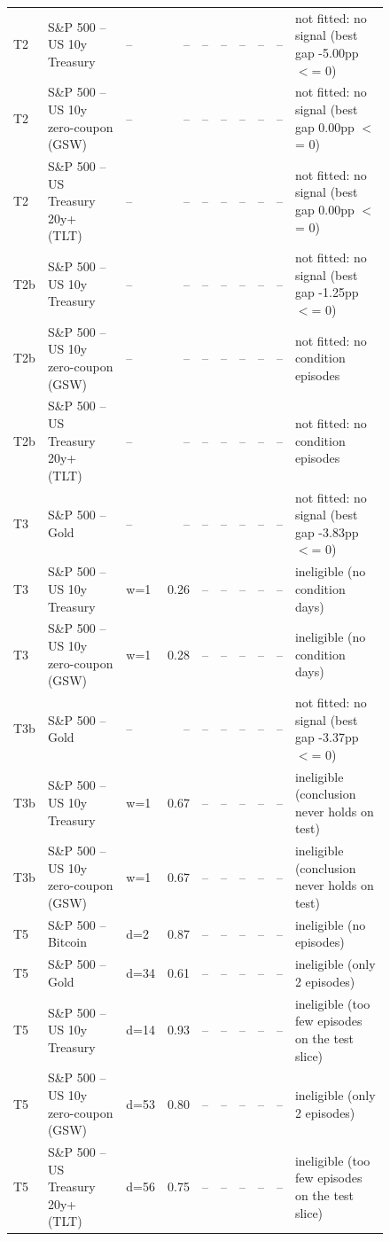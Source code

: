 \begin{figure}
\begin{tabular}{lllrrrrrrl}
T2 & S\&P 500 -- US 10y Treasury & -- & -- & -- & -- & -- & -- & -- & not fitted: no signal (best gap -5.00pp $<$= 0) \\
T2 & S\&P 500 -- US 10y zero-coupon (GSW) & -- & -- & -- & -- & -- & -- & -- & not fitted: no signal (best gap 0.00pp $<$= 0) \\
T2 & S\&P 500 -- US Treasury 20y+ (TLT) & -- & -- & -- & -- & -- & -- & -- & not fitted: no signal (best gap 0.00pp $<$= 0) \\
T2b & S\&P 500 -- US 10y Treasury & -- & -- & -- & -- & -- & -- & -- & not fitted: no signal (best gap -1.25pp $<$= 0) \\
T2b & S\&P 500 -- US 10y zero-coupon (GSW) & -- & -- & -- & -- & -- & -- & -- & not fitted: no condition episodes \\
T2b & S\&P 500 -- US Treasury 20y+ (TLT) & -- & -- & -- & -- & -- & -- & -- & not fitted: no condition episodes \\
T3 & S\&P 500 -- Gold & -- & -- & -- & -- & -- & -- & -- & not fitted: no signal (best gap -3.83pp $<$= 0) \\
T3 & S\&P 500 -- US 10y Treasury & w=1 & 0.26 & -- & -- & -- & -- & -- & ineligible (no condition days) \\
T3 & S\&P 500 -- US 10y zero-coupon (GSW) & w=1 & 0.28 & -- & -- & -- & -- & -- & ineligible (no condition days) \\
T3b & S\&P 500 -- Gold & -- & -- & -- & -- & -- & -- & -- & not fitted: no signal (best gap -3.37pp $<$= 0) \\
T3b & S\&P 500 -- US 10y Treasury & w=1 & 0.67 & -- & -- & -- & -- & -- & ineligible (conclusion never holds on test) \\
T3b & S\&P 500 -- US 10y zero-coupon (GSW) & w=1 & 0.67 & -- & -- & -- & -- & -- & ineligible (conclusion never holds on test) \\
T5 & S\&P 500 -- Bitcoin & d=2 & 0.87 & -- & -- & -- & -- & -- & ineligible (no episodes) \\
T5 & S\&P 500 -- Gold & d=34 & 0.61 & -- & -- & -- & -- & -- & ineligible (only 2 episodes) \\
T5 & S\&P 500 -- US 10y Treasury & d=14 & 0.93 & -- & -- & -- & -- & -- & ineligible (too few episodes on the test slice) \\
T5 & S\&P 500 -- US 10y zero-coupon (GSW) & d=53 & 0.80 & -- & -- & -- & -- & -- & ineligible (only 2 episodes) \\
T5 & S\&P 500 -- US Treasury 20y+ (TLT) & d=56 & 0.75 & -- & -- & -- & -- & -- & ineligible (too few episodes on the test slice) \\

\end{tabular}
\end{figure}
